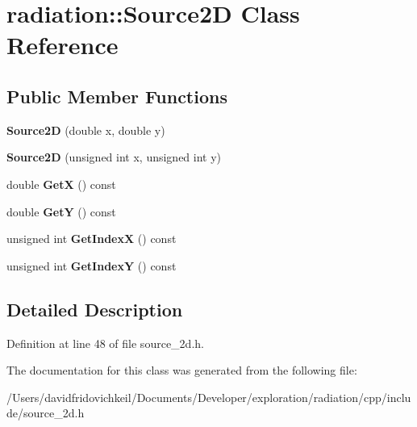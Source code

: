 \hypertarget{classradiation_1_1_source2_d}{}\section{radiation\+:\+:Source2D Class Reference}
\label{classradiation_1_1_source2_d}
\subsection*{Public Member Functions}
\begin{DoxyCompactItemize}
\item 
\hypertarget{classradiation_1_1_source2_d_a77c40f0693aeca9aecca60358e9e99cd}{}\label{classradiation_1_1_source2_d_a77c40f0693aeca9aecca60358e9e99cd} 
{\bfseries Source2D} (double x, double y)
\item 
\hypertarget{classradiation_1_1_source2_d_a08f06a80cc77cf3f7f851438303233c1}{}\label{classradiation_1_1_source2_d_a08f06a80cc77cf3f7f851438303233c1} 
{\bfseries Source2D} (unsigned int x, unsigned int y)
\item 
\hypertarget{classradiation_1_1_source2_d_ae84c063f555c2617105ab4ea765ac887}{}\label{classradiation_1_1_source2_d_ae84c063f555c2617105ab4ea765ac887} 
double {\bfseries GetX} () const
\item 
\hypertarget{classradiation_1_1_source2_d_a3e133dff5f226cca1e9895589651c930}{}\label{classradiation_1_1_source2_d_a3e133dff5f226cca1e9895589651c930} 
double {\bfseries GetY} () const
\item 
\hypertarget{classradiation_1_1_source2_d_a5918903c5b2aa85bd6833a8ce371a0e9}{}\label{classradiation_1_1_source2_d_a5918903c5b2aa85bd6833a8ce371a0e9} 
unsigned int {\bfseries Get\+IndexX} () const
\item 
\hypertarget{classradiation_1_1_source2_d_ae800ae88352d438fdee121f4141a8d67}{}\label{classradiation_1_1_source2_d_ae800ae88352d438fdee121f4141a8d67} 
unsigned int {\bfseries Get\+IndexY} () const
\end{DoxyCompactItemize}


\subsection{Detailed Description}


Definition at line 48 of file source\+\_\+2d.\+h.



The documentation for this class was generated from the following file\+:\begin{DoxyCompactItemize}
\item 
/\+Users/davidfridovichkeil/\+Documents/\+Developer/exploration/radiation/cpp/include/source\+\_\+2d.\+h\end{DoxyCompactItemize}
